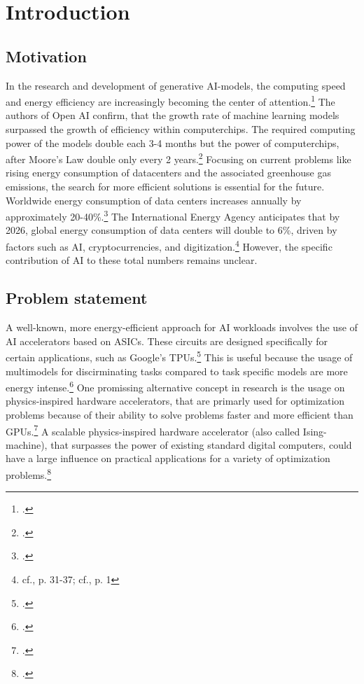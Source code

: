 \chapter{Introduction}


\section{Motivation}

In the research and development of generative AI-models, the computing speed and energy efficiency
are increasingly becoming the center of attention.\footcite[cf.][1]{luccioniPowerHungryProcessing2023}
The authors of Open AI confirm, that the growth rate of machine learning models 
surpassed the growth of efficiency within computerchips.
The required computing power of the models double each 3-4 months but the power of computerchips, after Moore’s Law 
double only every 2 years.\footcite[cf.][1]{darioamodeiAICompute}
Focusing on current problems like rising energy consumption of datacenters and the associated
greenhouse gas emissions, the search for more efficient solutions is essential for the future.
Worldwide energy consumption of data centers increases annually by approximately 20-40\%.\footcite[cf.][1]{hintemannDataCenters20212022} 
The International Energy Agency anticipates that by 2026, global energy consumption of data centers will double to 6\%, driven by factors such as AI, cryptocurrencies, and digitization.\footnote{cf.\cite{anon.Electricity2024Analysis2024}, p. 31-37; cf.\cite{jacksonAIBoomWill2024}, p. 1}
However, the specific contribution of AI to these total numbers remains unclear.

\section{Problem statement}

A well-known, more energy-efficient approach for AI workloads involves the use of AI accelerators based on \ac{ASIC}s.
These circuits are designed specifically for certain applications, such as Google's \ac{TPU}s.\footcite[cf.][39]{wittpahlKuenstlicheIntelligenzTechnologie2019} 
This is useful because the usage of multimodels for discirminating tasks compared to
task specific models are more energy intense.\footcite[cf.][5]{luccioniPowerHungryProcessing2023}
One promissing alternative concept in research is the usage on physics-inspired hardware accelerators, that are primarly used for optimization problems
because of their ability to solve problems faster and more efficient than GPUs.\footcite[cf.][1]{mohseniIsingMachinesHardware2022}
A scalable physics-inspired hardware accelerator (also called Ising-machine),
that surpasses the power of existing standard digital computers, could have a large influence
on practical applications for a variety of optimization problems.\footcite[cf.][1]{mohseniIsingMachinesHardware2022}

